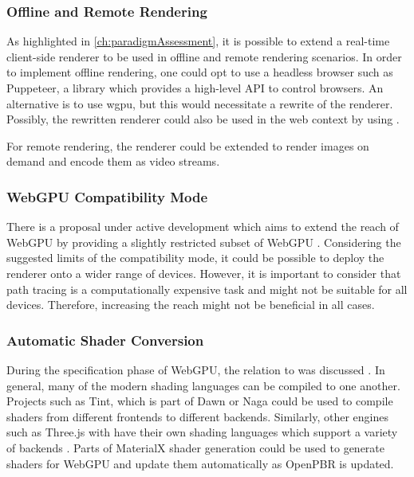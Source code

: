 \subsubsection*{Offline and Remote Rendering}

As highlighted in \autoref{ch:paradigmAssessment}, it is possible to extend a real-time client-side renderer to be used in offline and remote rendering scenarios. In order to implement offline rendering, one could opt to use a headless browser such as Puppeteer, a  library which provides a high-level \gls{API} to control browsers. An alternative is to use \gls{wgpu}, but this would necessitate a rewrite of the renderer. Possibly, the rewritten renderer could also be used in the web context by using .

For remote rendering, the renderer could be extended to render images on demand and encode them as video streams.

\subsubsection*{WebGPU Compatibility Mode}

There is a proposal under active development which aims to extend the reach of \gls{WebGPU} by providing a slightly restricted subset of WebGPU \cite{WebGPUCompatibilityModeProposal}. Considering the suggested limits of the compatibility mode, it could be possible to deploy the renderer onto a wider range of devices. However, it is important to consider that path tracing is a computationally expensive task and might not be suitable for all devices. Therefore, increasing the reach might not be beneficial in all cases.

\subsubsection*{Automatic Shader Conversion}

During the specification phase of \gls{WebGPU}, the relation to  was discussed \cite{webGPUSpirVRelation}. In general, many of the modern shading languages can be compiled to one another. Projects such as Tint, which is part of \gls{Dawn} \cite{dawnImplementation} or Naga \cite{nagaImplementation} could be used to compile shaders from different frontends to different backends. Similarly, other engines such as \gls{Three.js} with  have their own shading languages which support a variety of backends \cite{ThreeJSShadingLanguage}. Parts of \gls{MaterialX} shader generation could be used to generate shaders for \gls{WebGPU} and update them automatically as \gls{OpenPBR} is updated.

